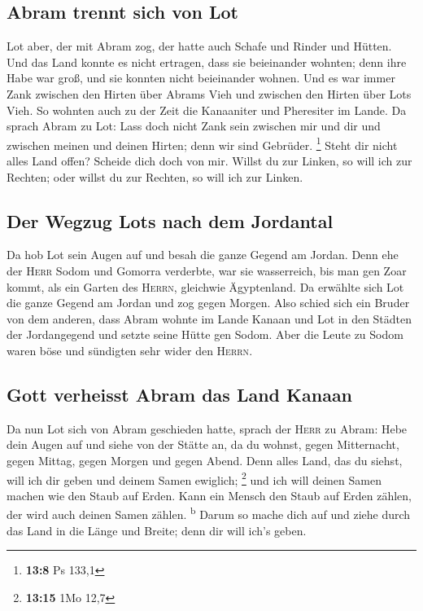 \hypertarget{abram-trennt-sich-von-lot}{%
\subsection{Abram trennt sich von Lot}\label{abram-trennt-sich-von-lot}}

 Lot aber, der mit Abram zog, der hatte auch Schafe und
Rinder und Hütten.  Und das Land konnte es nicht ertragen,
dass sie beieinander wohnten; denn ihre Habe war groß, und sie konnten
nicht beieinander wohnen.  Und es war immer Zank zwischen
den Hirten über Abrams Vieh und zwischen den Hirten über Lots Vieh. So
wohnten auch zu der Zeit die Kanaaniter und Pheresiter im Lande.
 Da sprach Abram zu Lot: Lass doch nicht Zank sein
zwischen mir und dir und zwischen meinen und deinen Hirten; denn wir
sind Gebrüder. \footnote{\textbf{13:8} Ps 133,1}  Steht
dir nicht alles Land offen? Scheide dich doch von mir. Willst du zur
Linken, so will ich zur Rechten; oder willst du zur Rechten, so will ich
zur Linken.

\hypertarget{der-wegzug-lots-nach-dem-jordantal}{%
\subsection{Der Wegzug Lots nach dem
Jordantal}\label{der-wegzug-lots-nach-dem-jordantal}}

 Da hob Lot sein Augen auf und besah die ganze Gegend am
Jordan. Denn ehe der \textsc{Herr} Sodom und Gomorra verderbte, war sie
wasserreich, bis man gen Zoar kommt, als ein Garten des \textsc{Herrn},
gleichwie Ägyptenland.  Da erwählte sich Lot die ganze
Gegend am Jordan und zog gegen Morgen. Also schied sich ein Bruder von
dem anderen,  dass Abram wohnte im Lande Kanaan und Lot
in den Städten der Jordangegend und setzte seine Hütte gen Sodom.
 Aber die Leute zu Sodom waren böse und sündigten sehr
wider den \textsc{Herrn}.

\hypertarget{gott-verheisst-abram-das-land-kanaan}{%
\subsection{Gott verheisst Abram das Land
Kanaan}\label{gott-verheisst-abram-das-land-kanaan}}

 Da nun Lot sich von Abram geschieden hatte, sprach der
\textsc{Herr} zu Abram: Hebe dein Augen auf und siehe von der Stätte an,
da du wohnst, gegen Mitternacht, gegen Mittag, gegen Morgen und gegen
Abend.  Denn alles Land, das du siehst, will ich dir
geben und deinem Samen ewiglich; \footnote{\textbf{13:15} 1Mo 12,7}
 und ich will deinen Samen machen wie den Staub auf
Erden. Kann ein Mensch den Staub auf Erden zählen, der wird auch deinen
Samen zählen. \textsuperscript{b}  Darum so mache dich
auf und ziehe durch das Land in die Länge und Breite; denn dir will
ich's geben.

